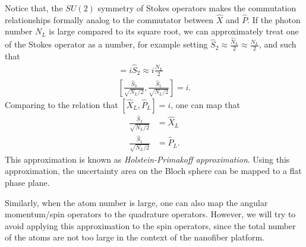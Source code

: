 \documentclass[]{report}
\begin{document}
Notice that, the $ SU(2) $ symmetry of Stokes operators makes the commutation relationships formally analog to the commutator between $ \hat{X} $ and $ \hat{P} $. If the photon number $ N_L $ is large compared to its square root, we can approximately treat one of the Stokes operator as a number, for example setting $ \hat{S}_2 \approx \frac{\hat{N}_L}{2}\approx \frac{N_L}{2} $, and such that
\begin{align}
[\hat{S}_3,\hat{S}_1] = i \hat{S}_2 \approx i\frac{N_L}{2}\\
\left[\frac{\hat{S}_3}{\sqrt{N_L/2}},\frac{\hat{S}_1}{\sqrt{N_L/2}}\right] = i.
\end{align}
Comparing to the relation that $ [\hat{X}_L,\hat{P}_L]=i $, one can map that 
\begin{align}
\frac{\hat{S}_3}{\sqrt{N_L/2}} &= \hat{X}_L\\
\frac{\hat{S}_1}{\sqrt{N_L/2}} &= \hat{P}_L. 
\end{align}
This approximation is known as \textit{Holstein-Primakoff approximation}. Using this approximation, the uncertainty area on the Bloch sphere can be mapped to a flat phase plane. 

Similarly, when the atom number is large, one can also map the angular momentum/spin operators to the quadrature operators. However, we will try to avoid applying this approximation to the spin operators, since the total number of the atoms are not too large in the context of the nanofiber platform. 
\end{document}
